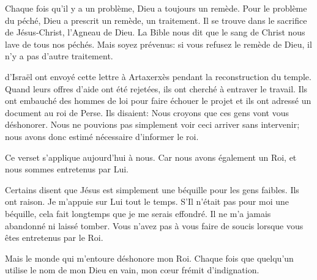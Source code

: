 Chaque fois qu'il y a un problème, Dieu a toujours un remède.
 Pour le problème du péché, Dieu a prescrit un remède, un traitement.
 Il se trouve dans le sacrifice de Jésus-Christ, l'Agneau de Dieu.
 La Bible nous dit que le sang de Christ nous lave de tous nos péchés.
 Mais soyez prévenus\space: si vous refusez le remède de Dieu,
 il n'y a pas d'autre traitement. 

\dvrule








 d'Israël ont envoyé cette lettre à Artaxerxès
 pendant la reconstruction du temple.
 Quand leurs offres d'aide ont été rejetées,
 ils ont cherché à entraver le travail.
 Ils ont embauché des hommes de loi pour faire échouer le projet
 et ils ont adressé un document au roi de Perse.
 Ils disaient\space: \og Nous croyons que ces gens vont vous déshonorer.
 Nous ne pouvions pas simplement voir ceci arriver sans intervenir\thinspace;
 nous avons donc estimé nécessaire d'informer le roi. \fg{}

Ce verset s'applique aujourd'hui à nous. Car nous avons également un Roi,
 et nous sommes entretenus par Lui.

Certains disent que Jésus est simplement une béquille pour les gens faibles.
 Ils ont raison. Je m'appuie sur Lui tout le temps.
 S'Il n'était pas pour moi une béquille,
 cela fait longtemps que je me serais effondré.
 Il ne m'a jamais abandonné ni laissé tomber.
 Vous n'avez pas à vous faire de soucis lorsque vous êtes entretenus par le Roi.

Mais le monde qui m'entoure déshonore mon Roi.
 Chaque fois que quelqu'un utilise le nom de mon Dieu en vain,
 mon cœur frémit d'indignation. 



